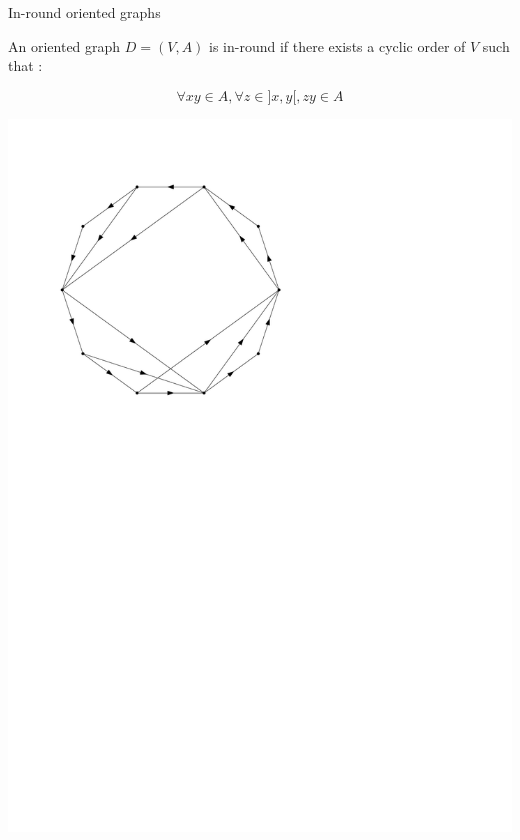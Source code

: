 \documentclass{beamer}
\begin{document}
\begin{frame}{In-round oriented graphs}
\begin{definition}
An oriented graph $D=(V,A)$ is in-round if there exists a cyclic order of $V$ such that :

$$\forall xy\in A, \forall z\in ]x,y[, zy\in A$$
\end{definition}

\centering

\includegraphics[scale=0.5]{Images/inround.pdf}
\end{frame}
\end{document}
